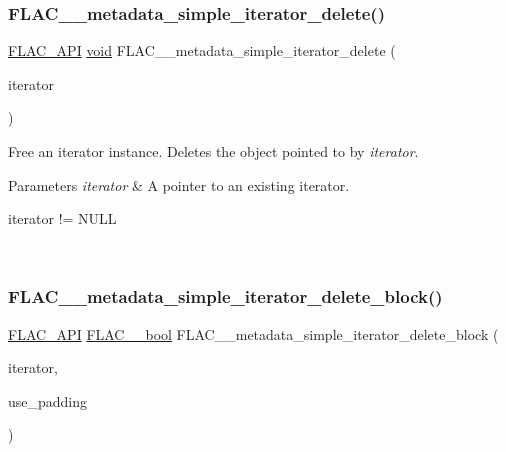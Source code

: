 \subsubsection{\texorpdfstring{F\+L\+A\+C\+\_\+\+\_\+metadata\+\_\+simple\+\_\+iterator\+\_\+delete()}{FLAC\_\_metadata\_simple\_iterator\_delete()}}
{\footnotesize\ttfamily \hyperlink{group__flac__export_ga56ca07df8a23310707732b1c0007d6f5}{F\+L\+A\+C\+\_\+\+A\+PI} \hyperlink{png_8h_ac9c84fa68bbad002983e35ce3663c686}{void} F\+L\+A\+C\+\_\+\+\_\+metadata\+\_\+simple\+\_\+iterator\+\_\+delete (\begin{DoxyParamCaption}\item[{\hyperlink{group__flac__metadata__level1_ga6accccddbb867dfc2eece9ee3ffecb3a}{F\+L\+A\+C\+\_\+\+\_\+\+Metadata\+\_\+\+Simple\+Iterator} $\ast$}]{iterator }\end{DoxyParamCaption})}

Free an iterator instance. Deletes the object pointed to by {\itshape iterator}.


\begin{DoxyParams}{Parameters}
{\em iterator} & A pointer to an existing iterator.  
\begin{DoxyCode}
iterator != NULL 
\end{DoxyCode}
 \\
\hline
\end{DoxyParams}
\mbox{\label{group__flac__metadata__level1_gaf0a1823f95f8097f0d2ff3f67ae30a88}} 
\subsubsection{\texorpdfstring{F\+L\+A\+C\+\_\+\+\_\+metadata\+\_\+simple\+\_\+iterator\+\_\+delete\+\_\+block()}{FLAC\_\_metadata\_simple\_iterator\_delete\_block()}}
{\footnotesize\ttfamily \hyperlink{group__flac__export_ga56ca07df8a23310707732b1c0007d6f5}{F\+L\+A\+C\+\_\+\+A\+PI} \hyperlink{ordinals_8h_a95103469f1cbd78b8cf250194985b34e}{F\+L\+A\+C\+\_\+\+\_\+bool} F\+L\+A\+C\+\_\+\+\_\+metadata\+\_\+simple\+\_\+iterator\+\_\+delete\+\_\+block (\begin{DoxyParamCaption}\item[{\hyperlink{group__flac__metadata__level1_ga6accccddbb867dfc2eece9ee3ffecb3a}{F\+L\+A\+C\+\_\+\+\_\+\+Metadata\+\_\+\+Simple\+Iterator} $\ast$}]{iterator,  }\item[{\hyperlink{ordinals_8h_a95103469f1cbd78b8cf250194985b34e}{F\+L\+A\+C\+\_\+\+\_\+bool}}]{use\+\_\+padding }\end{DoxyParamCaption})}

